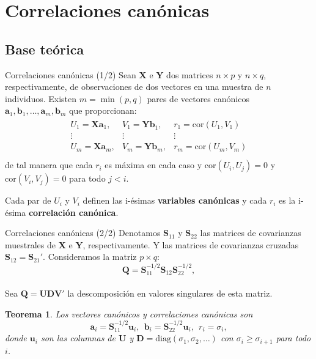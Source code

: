 \documentclass{beamer}
\newtheorem{teor}{Teorema}[section]
\begin{document}
\section{Correlaciones canónicas}
\subsection{Base teórica}
\begin{frame}{Correlaciones canónicas (1/2)}
Sean $\mathbf{X}$ e $\mathbf{Y}$ dos matrices $n  \times p$ y $n \times q$, respectivamente, de observaciones de dos vectores en una muestra de $n$ individuos. Existen $m = \min (p,q)$ pares de vectores canónicos $\mathbf{a}_1, \mathbf{b}_1, \ldots, \mathbf{a}_m, \mathbf{b}_m$ que proporcionan:
\begin{align*}
\begin{array}{ccc}
    U_1 = \mathbf{Xa}_1, & V_1 = \mathbf{Yb}_1, & r_1 = \mbox{cor}(U_1,V_1)\\
    \vdots & \vdots & \vdots\\
    U_m = \mathbf{Xa}_m, & V_m = \mathbf{Yb}_m, & r_m = \mbox{cor}(U_m,V_m)\\
\end{array}
\end{align*}
de tal manera que cada $r_i$ es máxima en cada caso y $\mbox{cor}(U_i, U_j)=0$ y $\mbox{cor}(V_i, V_j)=0$ para todo $j<i$. 

Cada par de $U_i$ y $V_i$ definen las i-ésimas \textbf{variables canónicas} y cada $r_i$ es la i-ésima \textbf{correlación canónica}.
\end{frame}


\begin{frame}{Correlaciones canónicas (2/2)}
Denotamos $\mathbf{S}_{11}$ y $\mathbf{S}_{22}$ las matrices de covarianzas muestrales de $\mathbf{X}$ e $\mathbf{Y}$, respectivamente. Y las matrices de covarianzas cruzadas $\mathbf{S}_{12} = \mathbf{S}_{21}'$.
Consideramos la matriz $p \times q$:
\begin{equation*}
    \mathbf{Q} = \mathbf{S}_{11}^{-1/2}\mathbf{S}_{12}\mathbf{S}_{22}^{-1/2},
\end{equation*}\\
Sea $\mathbf{Q = UDV'}$ la descomposición en valores singulares de esta matriz.
\begin{teor}
    Los vectores canónicos y correlaciones canónicas son
    \begin{equation*}
        \mathbf{a}_i = \mathbf{S}_{11}^{-1/2}\mathbf{u}_i,\ \  \mathbf{b}_i = \mathbf{S}_{22}^{-1/2}\mathbf{u}_i,\ \  r_i = \sigma_i,
    \end{equation*}
    donde $\mathbf{u}_i$ son las columnas de $\mathbf{U}$ y $\mathbf{D} = \mbox{diag}(\sigma_1, \sigma_2, \ldots)$ con $\sigma_i \geq \sigma_{i+1}$ para todo $i$.
\end{teor}
    
\end{frame}
\end{document}
